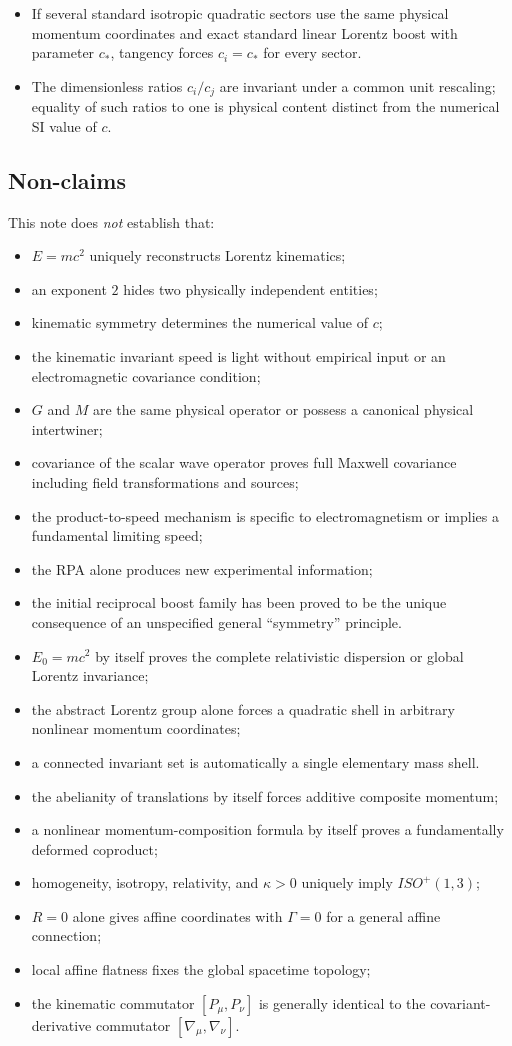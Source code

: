 \documentclass[11pt,a4paper]{article}
\begin{document}
\begin{itemize}
\item If several standard isotropic quadratic sectors use the same physical momentum coordinates and exact standard linear Lorentz boost with parameter $c_*$, tangency forces $c_i=c_*$ for every sector.
\item The dimensionless ratios $c_i/c_j$ are invariant under a common unit rescaling; equality of such ratios to one is physical content distinct from the numerical SI value of $c$.
\end{itemize}

\subsection{Non-claims}
This note does \emph{not} establish that:
\begin{itemize}
\item $E=mc^2$ uniquely reconstructs Lorentz kinematics;
\item an exponent $2$ hides two physically independent entities;
\item kinematic symmetry determines the numerical value of $c$;
\item the kinematic invariant speed is light without empirical input or an electromagnetic covariance condition;
\item $G$ and $M$ are the same physical operator or possess a canonical physical intertwiner;
\item covariance of the scalar wave operator proves full Maxwell covariance including field transformations and sources;
\item the product-to-speed mechanism is specific to electromagnetism or implies a fundamental limiting speed;
\item the RPA alone produces new experimental information;
\item the initial reciprocal boost family has been proved to be the unique consequence of an unspecified general ``symmetry'' principle.
\item $E_0=m c^2$ by itself proves the complete relativistic dispersion or global Lorentz invariance;
\item the abstract Lorentz group alone forces a quadratic shell in arbitrary nonlinear momentum coordinates;
\item a connected invariant set is automatically a single elementary mass shell.
\item the abelianity of translations by itself forces additive composite momentum;
\item a nonlinear momentum-composition formula by itself proves a fundamentally deformed coproduct;
\item homogeneity, isotropy, relativity, and $\kappa>0$ uniquely imply $ISO^+(1,3)$;
\item $R=0$ alone gives affine coordinates with $\Gamma=0$ for a general affine connection;
\item local affine flatness fixes the global spacetime topology;
\item the kinematic commutator $[P_\mu,P_\nu]$ is generally identical to the covariant-derivative commutator $[\nabla_\mu,\nabla_\nu]$.


\end{itemize}
\end{document}
